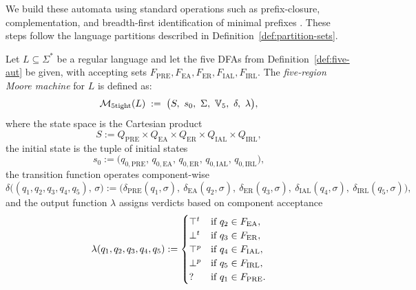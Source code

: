 We build these automata using standard operations such as prefix-closure, complementation, and breadth-first identification of minimal prefixes \cite{HopcroftUllman2001}. These steps follow the language partitions described in Definition~\ref{def:partition-sets}.

\begin{definition}\label{def:five-moore}
Let $L\subseteq\Sigma^*$ be a regular language and let the five DFAs from Definition~\ref{def:five-aut} be given, with accepting sets
$F_{\mathrm{PRE}},F_{\mathrm{EA}},F_{\mathrm{ER}},F_{\mathrm{IAL}},F_{\mathrm{IRL}}$.
The \emph{five-region Moore machine} for $L$ is defined as:
\[
  \mathcal{M}_{\text{5tight}}(L)
  \;:=\;
  \big(S,\ s_0,\ \Sigma,\ \tightverdicts,\ \delta,\ \lambda\big),
\]
where the state space is the Cartesian product
\[
S := Q_{\mathrm{PRE}}\times Q_{\mathrm{EA}}\times Q_{\mathrm{ER}}
      \times Q_{\mathrm{IAL}}\times Q_{\mathrm{IRL}},
\]
the initial state is the tuple of initial states
\[
s_0 := \big(q_{0,\mathrm{PRE}},\,q_{0,\mathrm{EA}},\,q_{0,\mathrm{ER}},\,
             q_{0,\mathrm{IAL}},\,q_{0,\mathrm{IRL}}\big),
\]
the transition function operates component-wise
$$
\delta\!\big((q_1,q_2,q_3,q_4,q_5),\,\sigma\big)
:= \big(\delta_{\mathrm{PRE}}(q_1,\sigma),\ \delta_{\mathrm{EA}}(q_2,\sigma),\
          \delta_{\mathrm{ER}}(q_3,\sigma),\
          \delta_{\mathrm{IAL}}(q_4,\sigma),\
          \delta_{\mathrm{IRL}}(q_5,\sigma)\big),
$$
and the output function $\lambda$ assigns verdicts based on component acceptance
\[
\lambda(q_1,q_2,q_3,q_4,q_5)
:= \begin{cases}
      \top^t & \text{if } q_2\in F_{\mathrm{EA}},\\
      \bot^t & \text{if } q_3\in F_{\mathrm{ER}},\\
      \top^p & \text{if } q_4\in F_{\mathrm{IAL}},\\
      \bot^p & \text{if } q_5\in F_{\mathrm{IRL}},\\
      \mathsf{?} & \text{if } q_1\in F_{\mathrm{PRE}}.
    \end{cases}
\]
\end{definition}

